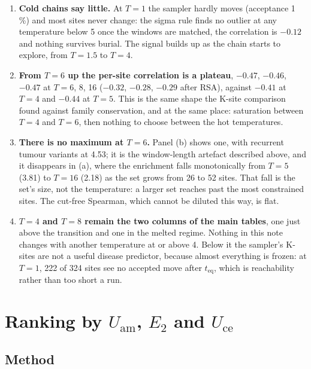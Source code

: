 \documentclass[11pt,a4paper]{article}
\newcommand{\Uam}{U_{\mathrm{am}}}
\newcommand{\Uce}{U_{\mathrm{ce}}}
\newcommand{\Etwo}{E_{2}}
\begin{document}
\begin{enumerate}
\item \textbf{Cold chains say little.} At $T=1$ the sampler hardly moves
  (acceptance 1\,\%) and most sites never change: the sigma rule finds no
  outlier at any temperature below 5 once the windows are matched, the
  correlation is $-0.12$ and nothing survives burial. The signal builds up as
  the chain starts to explore, from $T=1.5$ to $T=4$.
\item \textbf{From $T=6$ up the per-site correlation is a plateau}, $-0.47$,
  $-0.46$, $-0.47$ at $T=6$, 8, 16 ($-0.32$, $-0.28$, $-0.29$ after RSA),
  against $-0.41$ at $T=4$ and $-0.44$ at $T=5$. This is the same shape the
  K-site comparison found against family conservation, and at the same place:
  saturation between $T=4$ and $T=6$, then nothing to choose between the hot
  temperatures.
\item \textbf{There is no maximum at $T=6$.} Panel (b) shows one, with
  recurrent tumour variants at 4.53; it is the window-length artefact
  described above, and it disappears in (a), where the enrichment falls
  monotonically from $T=5$ (3.81) to $T=16$ (2.18) as the set grows from 26 to
  52 sites. That fall is the set's size, not the temperature: a larger set
  reaches past the most constrained sites. The cut-free Spearman, which cannot
  be diluted this way, is flat.
\item \textbf{$T=4$ and $T=8$ remain the two columns of the main tables},
  one just above the transition and one in the melted regime. Nothing in this
  note changes with another temperature at or above 4. Below it the sampler's
  K-sites are not a useful disease predictor, because almost everything is
  frozen: at $T=1$, 222 of 324 sites see no accepted move after
  $t_{\mathrm{eq}}$, which is reachability rather than too short a run.
\end{enumerate}

\section{Ranking by $\Uam$, $\Etwo$ and $\Uce$}\label{sec:rank}

\subsection{Method}
\end{document}
